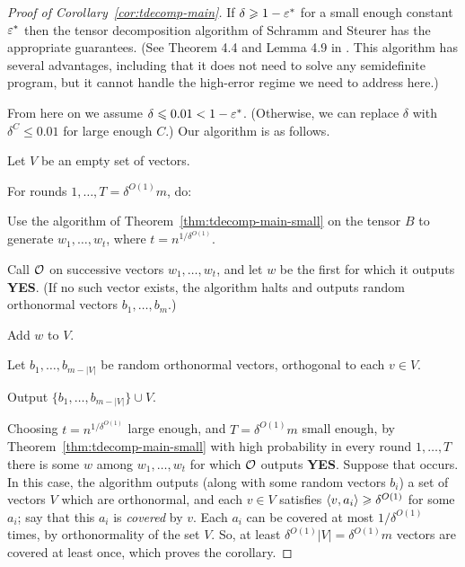 \begin{proof}[Proof of Corollary~\ref{cor:tdecomp-main}]
  If $\delta \geqslant 1 - \varepsilon^*$ for a small enough constant $\varepsilon^*$ then the tensor decomposition algorithm of Schramm and Steurer has the appropriate guarantees.
  (See Theorem 4.4 and Lemma 4.9 in \cite{DBLP:conf/colt/SchrammS17}.
  This algorithm has several advantages, including that it does not need to solve any semidefinite program, but it cannot handle the high-error regime we need to address here.)

  From here on we assume $\delta \leqslant 0.01 < 1 - \varepsilon^*$.
  (Otherwise, we can replace $\delta$ with $\delta^C \leq 0.01$ for large enough $C$.)
  Our algorithm is as follows.

  \begin{algorithm}
  \begin{compactenum}
    \item Let $V$ be an empty set of vectors.
    \item For rounds $1,\ldots,T = \delta^{O(1)} m$, do:
    \begin{compactenum}
      \item Use the algorithm of Theorem~\ref{thm:tdecomp-main-small} on the tensor $B$ to generate $w_1,\ldots,w_t$, where $t = n^{1/\delta^{O(1)}}$.
      \item Call $\mathcal O$ on successive vectors $w_1,\ldots,w_t$, and let $w$ be the first for which it outputs \textbf{YES}.
      (If no such vector exists, the algorithm halts and outputs random orthonormal vectors $b_1,\ldots,b_m$.)
      \item Add $w$ to $V$.
    \end{compactenum}
    \item Let $b_1,\ldots,b_{m - |V|}$ be random orthonormal vectors, orthogonal to each $v \in V$.
    \item Output $\{b_1,\ldots,b_{m-|V|}\} \cup V$.
  \end{compactenum}
  \end{algorithm}
  Choosing $t = n^{1/\delta^{O(1)}}$ large enough, and $T = \delta^{O(1)} m$ small enough, by Theorem~\ref{thm:tdecomp-main-small} with high probability in every round $1,\ldots,T$ there is some $w$ among $w_1,\ldots,w_t$ for which $\mathcal O$ outputs \textbf{YES}.
  Suppose that occurs.
  In this case, the algorithm outputs (along with some random vectors $b_i$) a set of vectors $V$ which are orthonormal, and each $v \in V$ satisfies $\langle v,a_i\rangle \geqslant \delta^{O(1)}$ for some $a_i$; say that this $a_i$ is \emph{covered} by $v$.
  Each $a_i$ can be covered at most $1/\delta^{O(1)}$ times, by orthonormality of the set $V$.
  So, at least $\delta^{O(1)} |V| = \delta^{O(1)}m$ vectors are covered at least once, which proves the corollary.
\end{proof}


